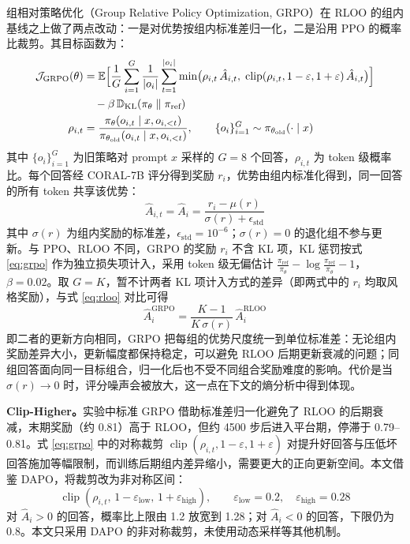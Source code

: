 \documentclass[fontset=fandol,type=master,campus=shenzhen,etitleauto=true]{hithesisbook}
\begin{document}
组相对策略优化（Group Relative Policy Optimization, GRPO）\cite{ref34}在 RLOO 的组内基线之上做了两点改动：一是对优势按组内标准差归一化，二是沿用 PPO 的概率比裁剪。其目标函数为：
\begin{equation}\label{eq:grpo}
\begin{aligned}
\mathcal{J}_{\text{GRPO}}(\theta) &= \mathbb{E} \Bigl[ \frac{1}{G}\sum_{i=1}^{G} \frac{1}{|o_i|}\sum_{t=1}^{|o_i|} \min\bigl( \rho_{i,t}\, \hat{A}_{i,t},\; \operatorname{clip}(\rho_{i,t}, 1-\varepsilon, 1+\varepsilon)\, \hat{A}_{i,t} \bigr) \Bigr] \\
&\quad - \beta\, \mathbb{D}_{\text{KL}}(\pi_\theta \parallel \pi_{\text{ref}}) \\
\rho_{i,t} &= \frac{\pi_\theta(o_{i,t} \mid x, o_{i,<t})}{\pi_{\theta_{\text{old}}}(o_{i,t} \mid x, o_{i,<t})}, \qquad \{o_i\}_{i=1}^{G} \sim \pi_{\theta_{\text{old}}}(\cdot \mid x)
\end{aligned}
\end{equation}
其中 $\{o_i\}_{i=1}^{G}$ 为旧策略对 prompt $x$ 采样的 $G = 8$ 个回答，$\rho_{i,t}$ 为 token 级概率比。每个回答经 CORAL-7B 评分得到奖励 $r_i$，优势由组内标准化得到，同一回答的所有 token 共享该优势：
\begin{equation}
\hat{A}_{i,t} = \hat{A}_i = \frac{r_i - \mu(r)}{\sigma(r) + \epsilon_{\text{std}}}
\end{equation}
其中 $\sigma(r)$ 为组内奖励的标准差，$\epsilon_{\text{std}} = 10^{-6}$；$\sigma(r) = 0$ 的退化组不参与更新。与 PPO、RLOO 不同，GRPO 的奖励 $r_i$ 不含 KL 项，KL 惩罚按式 \eqref{eq:grpo} 作为独立损失项计入，采用 token 级无偏估计 $\frac{\pi_{\text{ref}}}{\pi_\theta} - \log \frac{\pi_{\text{ref}}}{\pi_\theta} - 1$\cite{ref34}，$\beta = 0.02$。取 $G = K$，暂不计两者 KL 项计入方式的差异（即两式中的 $r_i$ 均取风格奖励），与式 \eqref{eq:rloo} 对比可得
\begin{equation}\label{eq:rloo-grpo}
\hat{A}_i^{\text{GRPO}} = \frac{K - 1}{K\, \sigma(r)}\, \hat{A}_i^{\text{RLOO}}
\end{equation}
即二者的更新方向相同，GRPO 把每组的优势尺度统一到单位标准差：无论组内奖励差异大小，更新幅度都保持稳定，可以避免 RLOO 后期更新衰减的问题；同组回答面向同一目标组合，归一化后也不受不同组合奖励难度的影响。代价是当 $\sigma(r) \to 0$ 时，评分噪声会被放大，这一点在下文的熵分析中得到体现。

\textbf{Clip-Higher。}实验中标准 GRPO 借助标准差归一化避免了 RLOO 的后期衰减，末期奖励（约 0.81）高于 RLOO，但约 4500 步后进入平台期，停滞于 0.79--0.81。式 \eqref{eq:grpo} 中的对称裁剪 $\operatorname{clip}(\rho_{i,t}, 1-\varepsilon, 1+\varepsilon)$ 对提升好回答与压低坏回答施加等幅限制，而训练后期组内差异缩小，需要更大的正向更新空间。本文借鉴 DAPO\cite{ref35}，将裁剪改为非对称区间：
\begin{equation}\label{eq:clip-higher}
\operatorname{clip}(\rho_{i,t},\, 1 - \varepsilon_{\text{low}},\, 1 + \varepsilon_{\text{high}}), \qquad \varepsilon_{\text{low}} = 0.2, \quad \varepsilon_{\text{high}} = 0.28
\end{equation}
对 $\hat{A}_i > 0$ 的回答，概率比上限由 1.2 放宽到 1.28；对 $\hat{A}_i < 0$ 的回答，下限仍为 0.8。本文只采用 DAPO 的非对称裁剪，未使用动态采样等其他机制。
\end{document}
